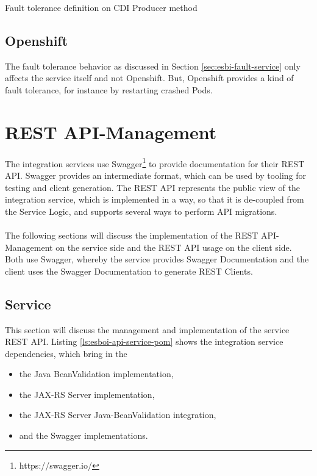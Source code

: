 \begin{listing}[h]
	\caption{Fault tolerance definition on CDI Producer method}
	\label{ls:esboi-fault-tolerance-java}
\end{listing} 

\subsection{Openshift}
\label{sec:esbi-fault-openshift}
The fault tolerance behavior as discussed in Section \vref{sec:esbi-fault-service} only affects the service itself and not Openshift. But, Openshift provides a kind of fault tolerance, for instance by restarting crashed Pods.
\newpage 

\section{REST API-Management}
\label{sec:esbi-api}
The integration services use Swagger\footnote{https://swagger.io/} to provide documentation for their REST API. Swagger provides an intermediate format, which can be used by tooling for testing and client generation. The REST API represents the public view of the integration service, which is implemented in a way, so that it is de-coupled from the Service Logic, and supports several ways to perform API migrations.
\\ \\
The following sections will discuss the implementation of the REST API-Management on the service side and the REST API usage on the client side. Both use Swagger, whereby the service provides Swagger Documentation and the client uses the Swagger Documentation to generate REST Clients.

\subsection{Service}
\label{sec:esbi-api-service}
This section will discuss the management and implementation of the service REST API. Listing \vref{ls:esboi-api-service-pom} shows the integration service dependencies, which bring in the 
\begin{itemize}
	\item the Java BeanValidation implementation, 
	\item the JAX-RS Server implementation,
	\item the JAX-RS Server Java-BeanValidation integration,
	\item and the Swagger implementations. 
\end{itemize}

